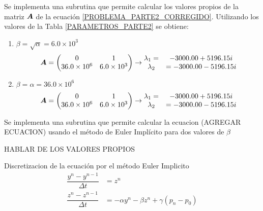Se implementa una subrutina que permite calcular los valores propios de la matriz $\boldsymbol{A}$ de la ecuación \ref{PROBLEMA_PARTE2_CORREGIDO}. Utilizando los valores de la Tabla \ref{PARAMETROS_PARTE2} se obtiene:
\begin{enumerate} [label=(\alph*)]
\item $\beta = \sqrt{\alpha} = 6.0 \times 10^3 $
\begin{equation}
\boldsymbol{A} = \begin{pmatrix} 0 & 1 \\ 36.0 \times 10^6 & 6.0 \times 10^3 \end{pmatrix} \rightarrow 
\begin{matrix} \lambda_1 = & -3000.00 + 5196.15 i \\ \lambda_2 &= -3000.00 - 5196.15 i \end{matrix}
\end{equation} 
\item $\beta = \alpha =  36.0 \times 10^6 $
\begin{equation}
\boldsymbol{A} = \begin{pmatrix} 0 & 1 \\ 36.0 \times 10^6 & 6.0 \times 10^3 \end{pmatrix} \rightarrow 
\begin{matrix} \lambda_1 = & -3000.00 + 5196.15 i \\ \lambda_2 &= -3000.00 - 5196.15 i \end{matrix}
\end{equation} 
\end{enumerate}

Se implementa una subrutina que permite calcular la ecuacion (AGREGAR ECUACION) usando el método de Euler Implícito para dos valores de $\beta$ 




HABLAR DE LOS VALORES PROPIOS


Discretizacion de la ecuación por el método Euler Implicito
\begin{align}
\dfrac{y^n - y^{n-1}}{\Delta t} &= z^n \\
\dfrac{z^n - z^{n-1}}{\Delta t} &= -\alpha y^n - \beta z^n + \gamma (p_n-p_0) \\
\end{align}

